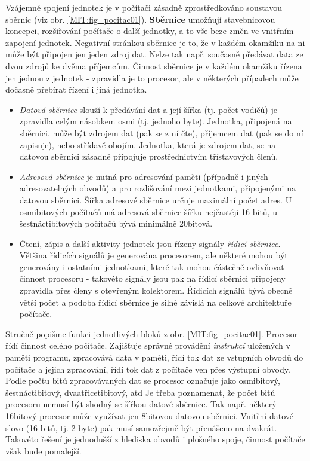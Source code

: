     Vzájemné spojení jednotek je v počítači zásadně zprostředkováno soustavou sběrnic (viz obr. 
    \ref{MIT:fig_pocitac01}). \textbf{Sběrnice} umožňují stavebnicovou koncepci, rozšiřování počítače o další 
    jednotky, a to vše beze změn ve vnitřním zapojení jednotek. Negativní stránkou sběrnice je to, že v 
    každém okamžiku na ni může být připojen jen jeden zdroj dat. Nelze tak např. současně předávat data ze 
    dvou zdrojů ke dvěma příjemcům. Činnost sběrnice je v každém okamžiku řízena jen jednou z jednotek - 
    zpravidla je to procesor, ale v některých případech může dočasně přebírat řízení i jiná jednotka. 
    \begin{itemize}
      \item \emph{Datová sběrnice} slouží k předávání dat a její šířka (tj. počet vodičů) je zpravidla 
      celým násobkem osmi (tj. jednoho byte). Jednotka, připojená na sběrnici, může být zdrojem dat (pak se z 
      ní čte), příjemcem dat (pak se do ní zapisuje), nebo střídavě obojím. Jednotka, která je zdrojem dat, 
      se na datovou sběrnici zásadně připojuje prostřednictvím třístavových členů.
      
      \item \emph{Adresová sběrnice} je nutná pro adresování paměti (případně i jiných adresovatelných 
      obvodů) a pro rozlišování mezi jednotkami, připojenými na datovou sběrnici. Šířka adresové sběrnice 
      určuje maximální počet adres. U osmibitových počítačů má adresová sběrnice šířku nejčastěji 16 bitů, u 
      šestnáctibitových počítačů bývá minimálně 20bitová.
      
      \item Čtení, zápis a další aktivity jednotek jsou řízeny signály \emph{řídicí sběrnice}. Většina 
      řídicích signálů je generována procesorem, ale některé mohou být generovány i ostatními jednotkami, 
      které tak mohou částečně ovlivňovat činnost procesoru - takovéto signály jsou pak na řídicí sběrnici 
      připojeny zpravidla přes členy s otevřeným kolektorem. Řídicích signálů bývá obecně větší počet a 
      podoba řídicí sběrnice je silně závislá na celkové architektuře počítače.
    \end{itemize}
    
    Stručně popišme funkci jednotlivých bloků z obr. \ref{MIT:fig_pocitac01}. Procesor řídí činnost celého 
    počítače. Zajišťuje správné provádění \emph{instrukcí} uložených v paměti programu, zpracovává data v 
    paměti, řídí tok dat ze vstupních obvodů do počítače a jejich zpracování, řídí tok dat z počítače ven 
    přes výstupní obvody. Podle počtu bitů zpracovávaných dat se procesor označuje jako osmibitový, 
    šestnáctibitový, dvaatřicetibitový, atd Je třeba poznamenat, že počet bitů procesoru nemusí být shodný se 
    šířkou datové sběrnice. Tak např. některý 16bitový procesor může využívat jen 8bitovou datovou sběrnici. 
    Vnitřní datové slovo (16 bitů, tj. 2 byte) pak musí samozřejmě být přenášeno na dvakrát. Takovéto řešení 
    je jednodušší z hlediska obvodů i plošného spoje, činnost počítače však bude pomalejší.
    
